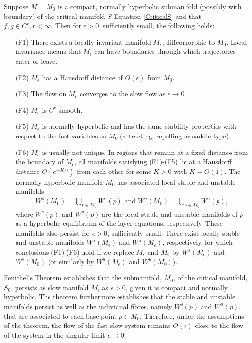 \begin{theorem} \label{Fenichel}	
	Suppose $M=M_0$ is a compact, normally hyperbolic submanifold  (possibly with boundary) of the critical manifold $S$ Equation \ref{CriticalS} 	and  that $f, g \in C^r, r < \infty $. Then for $\epsilon >0$, sufficiently small, the following holds:
	\begin{itemize} 	
	\item[(F1)] There exists a locally invariant manifold $M_{\epsilon}$, diffeomorphic to  $M_0$. Local invariance means that $M_{\epsilon}$ can have boundaries through which trajectories enter or leave.
	\item[(F2)]  $M_{\epsilon}$ has a Hausdorff distance of $O(\epsilon)$ from $M_0$.
	\item[(F3) ] The flow on $M_{\epsilon}$  converges to the slow flow as $\epsilon \to 0$.
	\item[(F4)]  $M_{\epsilon}$ is $C^r$-smooth.
	\item[(F5)]  $M_{\epsilon}$ is normally hyperbolic and has the same stability properties with respect to the fast variables as $M_0$ (attracting, repelling or saddle type).
	\item[(F6)]  $M_{\epsilon}$ is usually not unique. In regions that remain at a fixed distance from the boundary of  $M_{\epsilon}$, all manifolds satisfying (F1)-(F5) lie at a Hausdorff distance $O(e^{-K/\epsilon})$ from each other for some $K>0$ with $K=O(1)$.
	The normally hyperbolic manifold $M_0$ has associated local stable and unstable manifolds
	\begin{align*}
	W^s(M_0) =\bigcup_{p \in M_0} W^s(p) \textrm{\ \ and\ \ } W^u(M_0) =\bigcup_{p \in M_0} W^u(p),
	\end{align*}
	where  $W^s(p)$ and $W^u(p)$ are the local stable and unstable manifolds of $p$ as a hyperbolic equilibrium of the layer equations, respectively. These manifolds also persist for $\epsilon > 0$, sufficiently small. There exist locally stable and unstable manifolds $W^s(M_\epsilon)$ and $W^u(M_\epsilon)$, respectively, for which conclusions (F1)-(F6) hold if we replace $M_\epsilon$ and $M_0$ by  $W^s(M_\epsilon)$ and $W^s(M_0)$ (or similarly by  $W^u(M_\epsilon)$ and $W^u(M_0)$).
	\end{itemize}
\end{theorem} 
Fenichel's Theorem establishes that the submanifold, $M_0$, of the critical manifold, $S_0$, persists as slow manifold $M_\epsilon$ as $\epsilon >0$, given it is compact and normally hyperbolic. The theorem furthermore establishes that the stable and unstable manifolds persist as well as the individual fibres, namely $W^s(p)$ and $W^u(p)$, that are associated to each base point $p \in M_0$.
Therefore, under the assumptions of the theorem, the flow of the fast-slow system remains $O(\epsilon)$ close to the flow of the system in the singular limit $\epsilon \to 0$.\\

